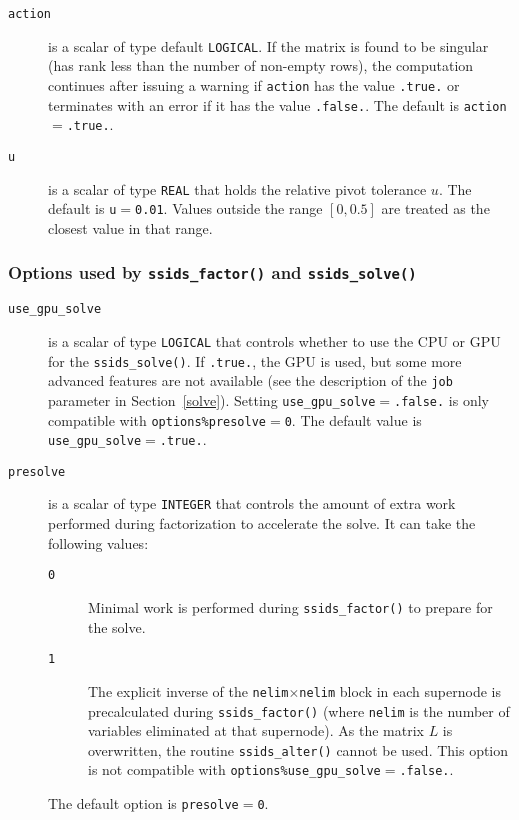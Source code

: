 \begin{description}
\item[\texttt{action}] is a scalar of type default {\tt LOGICAL}.
If the matrix is found to be singular (has rank less than the number of
non-empty rows), the computation continues after issuing a warning if
{\tt action} has the value {\tt .true.} or
terminates with an error if it has the value {\tt .false.}.
The default is {\tt action}$=${\tt .true.}.


\item[\texttt{u}] is a scalar of type {\tt REAL} that holds the relative pivot
tolerance $u$.
The default is {\tt u}$=${\tt 0.01}.
Values outside the range $[0,0.5]$ are treated as the closest value in that range.

\end{description}

\subsubsection*{Options used by {\tt ssids\_factor()} and {\tt ssids\_solve()}}

\begin{description}
\item[\texttt{use\_gpu\_solve}] is a scalar of type {\tt LOGICAL} that controls
   whether to use the CPU or GPU for the \texttt{ssids\_solve()}. If
   \texttt{.true.}, the GPU is used, but some more advanced features are not
   available (see the description of the \texttt{job} parameter in
   Section~\ref{solve}).
   Setting \texttt{use\_gpu\_solve}$=${\tt .false.} is only compatible with
   \texttt{options\%presolve}$=${\tt 0}.
   The default value is \texttt{use\_gpu\_solve}$=$\texttt{.true.}.
\item[\texttt{presolve}] is a scalar of type {\tt INTEGER} that controls the
   amount of extra work performed during factorization to accelerate the solve.
   It can take the following values:
   \begin{description}
      \item[\texttt{0}] Minimal work is performed during {\tt ssids\_factor()}
         to prepare for the solve.
      \item[\texttt{1}] The explicit inverse of the
         \texttt{nelim}$\times$\texttt{nelim} block in each supernode is
         precalculated during {\tt ssids\_factor()} (where \texttt{nelim} is
         the number of variables eliminated at that supernode). As the matrix
         $L$ is overwritten, the routine {\tt ssids\_alter()} cannot be used.
         This option is not compatible with {\tt options\%use\_gpu\_solve}$=$\texttt{.false.}.
   \end{description}
   The default option is \texttt{presolve}$=$\texttt{0}.
\end{description}

